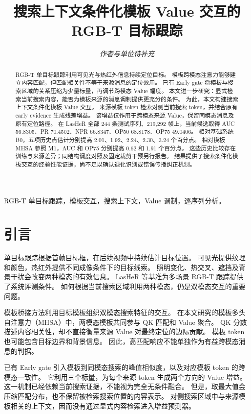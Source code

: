 \documentclass[journal]{IEEEtran}
\begin{document}
\title{搜索上下文条件化模板 Value 交互的 RGB-T 目标跟踪}
\author{\textit{作者与单位待补充}}
\maketitle

\begin{abstract}
RGB-T 单目标跟踪利用可见光与热红外信息持续定位目标。
模板跨模态注意力能够建立内容匹配，但匹配相关性不等于来源消息的定位效用。
已有 Early gate 将模板与搜索区域的关系压缩为少量标量，再调节跨模态 Value 幅度。
本文进一步研究：显式检索当前搜索内容，能否为模板来源的消息调制提供更充分的条件。
为此，本文构建搜索上下文条件化模板 Value 交互。
来源模板 token 检索对侧当前搜索 token，并结合原有 early evidence 生成残差增益。
该增益仅作用于跨模态来源 Value，保留同模态消息及原有定位路径。
在 LasHeR 全部 244 条测试序列、219,292 帧上，当前候选取得 AUC 56.8305、PR 70.4502、NPR 66.8347、OP50 68.8178、OP75 49.0406。
相对基础系统 B0，五项历史点估计分别提高 2.01、1.92、2.24、2.30、3.24 个百分点。
相对模板 MHSA 参照 M1，AUC 和 OP75 分别提高 0.62 和 1.91 个百分点。
这些历史比较存在训练与来源差异；同结构调度对照及固定裁剪干预另行报告。
结果提供了搜索条件化模板交互的经验性能证据，尚不足以确认退化识别或错误传播纠正机制。
\end{abstract}

\begin{IEEEkeywords}
RGB-T 单目标跟踪，模板交互，搜索上下文，Value 调制，逐序列分析。
\end{IEEEkeywords}

\section{引言}
单目标跟踪根据首帧目标框，在后续视频中持续估计目标位置。
可见光提供纹理和颜色，热红外提供不同成像条件下的目标线索。
照明变化、热交叉、遮挡及背景干扰会改变两种模态的有效信息。
LasHeR 等基准为多场景 RGB-T 跟踪提供了系统评测条件\cite{li2022lasher}。
如何根据当前搜索区域利用两种模态，仍是双模态交互的重要问题。

模板桥接方法利用目标模板组织双模态搜索特征的交互\cite{hui2023tbsi,li2025tbsi}。
在本文研究的模板多头自注意力（MHSA）中，两模态模板共同参与 QK 匹配和 Value 聚合。
QK 分数描述内容相关性，却不直接衡量来源 Value 对最终定位的边际贡献。
模板 token 也可能包含目标边界和背景信息。
因此，高匹配响应不能单独作为有益跨模态消息的判据。

已有 Early gate 引入模板到同模态搜索的峰值相似度，以及对应模板 token 的跨模态一致性。
它利用三个标量，为每个来源 token 生成两个方向的 Value 增益。
这一机制已经依赖当前搜索证据，不能视为完全无条件融合。
但是，取最大值会压缩匹配分布，也不保留被检索搜索位置的内容表示。
对侧搜索区域中与来源模板相关的上下文，因而没有通过显式内容检索进入增益预测器。
\end{document}
